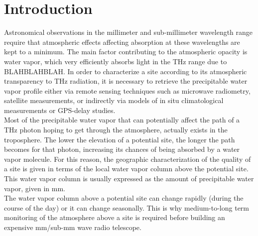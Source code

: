 \documentclass[12pt]{iopart}
\begin{document}
%
%
%
% 
%


\section{Introduction}


Astronomical observations in the millimeter and sub-millimeter wavelength range require that atmospheric effects affecting absorption at these wavelengths are kept to a minimum. The main factor contributing to the atmospheric opacity is water vapor, which very efficiently absorbs light in the THz range due to BLAHBLAHBLAH. In order to characterize a site according to its atmospheric transparency to THz radiation, it is necessary to retrieve the precipitable water vapor profile either via remote sensing techniques such as microwave radiometry, satellite measurements, or indirectly via models of in situ climatological measurements or GPS-delay studies. \\

Most of the precipitable water vapor that can potentially affect the path of a THz photon hoping to get through the atmosphere, actually exists in the troposphere. The lower the elevation of a potential site, the longer the path becomes for that photon, increasing its chances of being absorbed by a water vapor molecule. For this reason, the geographic characterization of the quality of a site is given in terms of the local water vapor column above the potential site. This water vapor column is usually expressed as the amount of precipitable water vapor, given in mm.\\

The water vapor column above a potential site can change rapidly (during the course of the day) or it can change seasonally. This is why medium-to-long term monitoring of the atmosphere above a site is required before building an expensive mm/sub-mm wave radio telescope.\\
\end{document}
